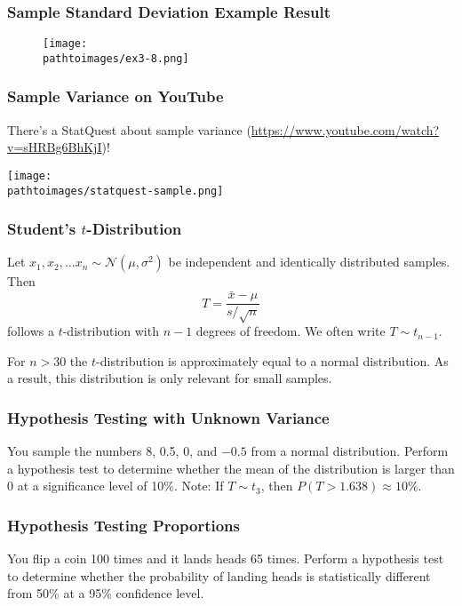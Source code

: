 \documentclass{beamer}
\newcommand{\pathtoimages}{/Users/charlesrambo/Desktop/Bootcamp24/Images}
\begin{document}
\begin{frame}
\frametitle{Sample Standard Deviation Example Result}
\begin{figure}
\centering
\texttt{[image: \\pathtoimages/ex3-8.png]}
\end{figure}
\end{frame}

\begin{frame}
\frametitle{Sample Variance on YouTube}
\small 
There's a StatQuest about sample variance ({\small \url{https://www.youtube.com/watch?v=sHRBg6BhKjI}})!
\begin{center}
\texttt{[image: \\pathtoimages/statquest-sample.png]}
\end{center}

\end{frame}

\begin{frame}
\frametitle{Student's $t$-Distribution}
\begin{Definition}
Let $x_1, x_2,\ldots x_n\sim{\mathcal{N}(\mu, \sigma^2)}$ be independent and identically distributed samples. Then
$$
T = \frac{\bar{x} - \mu}{s/\sqrt{n}}
$$
follows a $t$-distribution with $n-1$ degrees of freedom. We often write $T \sim{t_{n-1}}$.
\end{Definition}
For $n > 30$ the $t$-distribution is approximately equal to a normal distribution. As a result, this distribution is only relevant for small samples. 
\end{frame}

\begin{frame}[t]
\frametitle{Hypothesis Testing with Unknown Variance}
\tiny
\begin{Example}
You sample the numbers 8, 0.5, 0, and $-0.5$ from a normal distribution. Perform a hypothesis test to determine whether the mean of the distribution is larger than 0 at a significance level of 10\%. Note: If $T\sim{t_3}$, then $P(T > 1.638) \approx 10\%$.
\end{Example}

\end{frame}

\begin{frame}[t]
\frametitle{Hypothesis Testing Proportions}
\tiny
\begin{Example}
You flip a coin 100 times and it lands heads 65 times. Perform a hypothesis test to determine whether the probability of landing heads is statistically different from 50\% at a 95\% confidence level.
\end{Example}


\end{frame}
\end{document}
